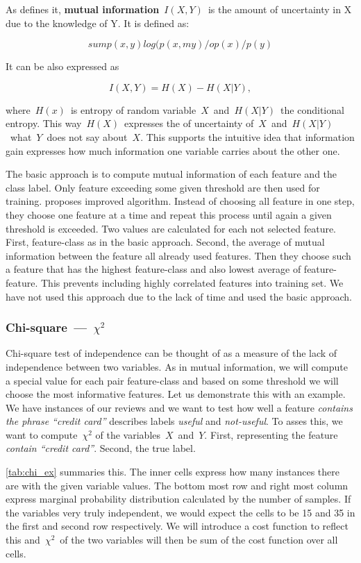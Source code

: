 As \citet{Hoq14} defines it, {\bf mutual information}~$I(X, Y)$~is the amount of uncertainty in X due to the knowledge of Y. It is defined as:

$$sum p(x,y) log(p(x,my)/op(x)/p(y)$$

It can be also expressed as

$$I(X, Y) = H(X) - H(X|Y),$$

where~$H(x)$~is entropy of random variable~$X$~and~$H(X|Y)$~the conditional entropy.
This way~$H(X)$~expresses the of uncertainty of~$X$~and~$H(X|Y)$~what~$Y$~does not say about~$X$.
This supports the intuitive idea that information gain expresses how much information one variable carries about the other one.

The basic approach is to compute mutual information of each feature and the class label.
Only feature exceeding some given threshold are then used for training.
\citet{Hoq14} proposes improved algorithm.
Instead of choosing all feature in one step, they choose one feature at a time and repeat this process until again a given threshold is exceeded.
Two values are calculated for each not selected feature.
First, feature-class as in the basic approach.
Second, the average of mutual information between the feature all already used features.
Then they choose such a feature that has the highest feature-class and also lowest average of feature-feature.
This prevents including highly correlated features into training set.
We have not used this approach due to the lack of time and used the basic approach.



\subsubsection{Chi-square~---~$\chi^2$}

Chi-square test of independence can be thought of
as a measure of the lack of independence between two variables.
As in mutual information,
we will compute a special value for each pair feature-class
and based on some threshold we will choose the most informative features.
Let us demonstrate this with an example.
We have instances of our reviews and we want to test how well
a feature \textit{contains the phrase ``credit card''} describes
labels \textit{useful} and \textit{not-useful}.
To asses this, we want to compute~$\chi^2$ of the variables~$X$~and~$Y$.
First, representing the feature \textit{contain ``credit card''}.
Second, the true label.

\autoref{tab:chi_ex} summaries this.
The inner cells express how many instances there are with the given variable values.
The bottom most row and right most column express marginal probability distribution 
calculated by the number of samples.
If the variables very truly independent,
we would expect the cells to be 15 and 35 in the first and second row respectively.
We will introduce a cost function to reflect this
and~$\chi^2$~of the two variables will then be sum of the cost function over all cells.


